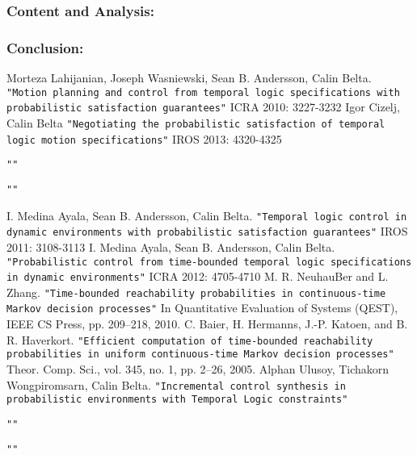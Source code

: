 \documentclass{article}
\begin{document}
\subsubsection{Content and Analysis:}

\subsubsection{Conclusion:}




\begin{thebibliography}{}
Morteza Lahijanian, Joseph Wasniewski, Sean B. Andersson, Calin Belta.
\texttt{"Motion planning and control from temporal logic specifications with probabilistic satisfaction guarantees"}
ICRA 2010: 3227-3232
Igor Cizelj, Calin Belta
\texttt{"Negotiating the probabilistic satisfaction of temporal logic motion specifications"}
IROS 2013: 4320-4325

\texttt{""}


\texttt{""}


I. Medina Ayala, Sean B. Andersson, Calin Belta.
\texttt{"Temporal logic control in dynamic environments with probabilistic satisfaction guarantees"}
IROS 2011: 3108-3113
I. Medina Ayala, Sean B. Andersson, Calin Belta.
\texttt{"Probabilistic control from time-bounded temporal logic specifications in dynamic environments"}
ICRA 2012: 4705-4710
M. R. NeuhauBer and L. Zhang.
\texttt{"Time-bounded reachability probabilities
in continuous-time Markov decision processes"}
In Quantitative Evaluation of Systems (QEST), IEEE CS Press, pp. 209–218, 2010.
C. Baier, H. Hermanns, J.-P. Katoen, and B. R. Haverkort.
\texttt{"Efficient computation of time-bounded reachability probabilities in uniform continuous-time Markov decision processes"}
Theor. Comp. Sci., vol. 345, no. 1, pp. 2–26, 2005.
Alphan Ulusoy, Tichakorn Wongpiromsarn, Calin Belta.
\texttt{"Incremental control synthesis in probabilistic environments with Temporal Logic constraints"}

\texttt{""}

\texttt{""}


\end{thebibliography}
\end{document}
